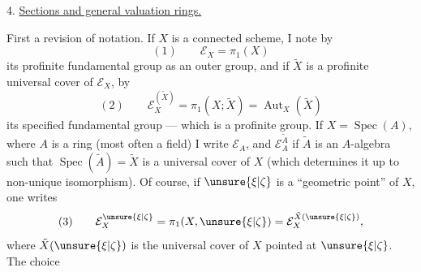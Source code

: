 4. \uline{Sections  and general valuation rings.}

First a revision of notation. If $X$ is a connected scheme, I note by 
\[
(1)\qquad \mathcal E_X=\pi_1(X)
\]
its profinite fundamental group as an outer group, and if $\tilde X$ is a profinite universal cover of $\mathcal E_X$, by
\[
(2)\qquad \mathcal E_X^{(\tilde X)}=\pi_1(X;\tilde X)=\operatorname{Aut}_X(\tilde X)
\]
its specified fundamental group --- which is a profinite group. If $X=\operatorname{Spec}(A)$, where $A$ is a ring (most often a field) I write $\mathcal E_A$, and $\mathcal E_A^{\tilde A}$  if $\tilde A$ is an $A$-algebra such that $\operatorname{Spec}(\tilde A)=\tilde X$ is a universal cover of $X$ (which determines it up to non-unique isomorphism). Of course, if $\unsure{\xi|\zeta}$ is a ``geometric point'' of $X$, one writes
\[
(3)\qquad \mathcal E_X^{\unsure{\xi|\zeta}}=\pi_1(X,\unsure{\xi|\zeta})=\mathcal E_X^{\tilde X(\unsure{\xi|\zeta})},
\]
where $\tilde X(\unsure{\xi|\zeta})$ is the universal cover of $X$ pointed at $\unsure{\xi|\zeta}$. The choice
